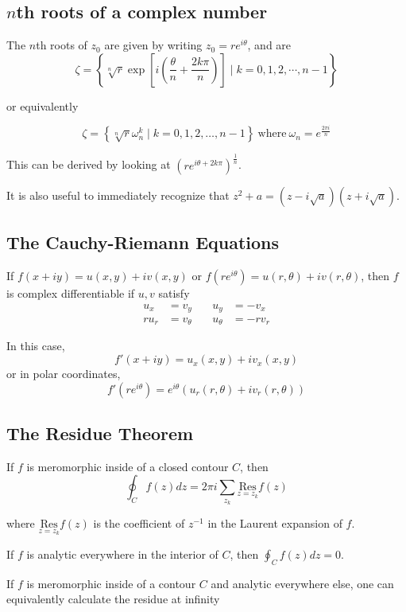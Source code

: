 \documentclass{article}
\begin{document}
\subsection{$n$th roots of a complex number}
The $n$th roots of $z_0$ are given by writing $z_0 = re^{i\theta}$, and are 
\[\zeta = \left\{ \sqrt[n]{r} \exp\left[{i\left( \frac{\theta}{n} + \frac{2k\pi}{n}\right)}\right] \mid k = 0,1,2,\cdots, n-1\right\}\]

or equivalently

\[\zeta = \left\{ \sqrt[n]{r}\omega_n^k \mid k = 0,1,2,\ldots, n-1\right\}~\text{where}~\omega_n = e^{\frac{2\pi i}{n}}\]

This can be derived by looking at $\left( re^{i\theta + 2k\pi}\right)^{\frac{1}{n}}$.

It is also useful to immediately recognize that $z^2+a = (z-i\sqrt{a})(z+i\sqrt{a})$.

\subsection{The Cauchy-Riemann Equations}

If $f(x+iy) = u(x,y) + iv(x,y)$ or $f(re^{i\theta}) = u(r,\theta) + iv(r,\theta)$, then $f$ is complex differentiable if $u,v$ satisfy 
\begin{align*}
    u_x &= v_y &\quad u_y &= -v_x \\
    ru_r &= v_\theta &\quad u_\theta &= -rv_r
\end{align*}

In this case, 
\[
f'(x+iy) = u_x(x,y) + iv_x(x,y)
\] 
or in polar coordinates, 
\[
f'(re^{i\theta}) = e^{i\theta}(u_r(r,\theta) + iv_r(r,\theta))
\]

\subsection{The Residue Theorem}


If $f$ is meromorphic inside of a closed contour $C$, then
\[ 
\oint_C f(z) dz = 2\pi i \sum_{z_k} \underset{z=z_k}{\text{Res}} f(z)
\]

where $\underset{z=z_k}{\text{Res}} f(z)$ is the coefficient of $z^{-1}$ in the Laurent expansion of $f$.

If $f$ is analytic everywhere in the interior of $C$, then $\oint_C f(z) dz = 0$.


If $f$ is meromorphic inside of a contour $C$ and analytic everywhere else, one can equivalently calculate the residue at infinity
\end{document}
